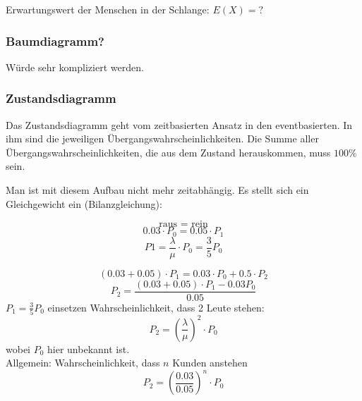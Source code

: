 \documentclass[11pt, a4paper]{article}
\begin{document}
Erwartungswert der Menschen in der Schlange: $E(X) = ?$

\subsubsection{Baumdiagramm?}

\begin{figure}[H]
\centering
{}
\end{figure}

Würde sehr kompliziert werden.

\subsubsection{Zustandsdiagramm}
Das Zustandsdiagramm geht vom zeitbasierten Ansatz in den eventbasierten. In ihm sind die jeweiligen Übergangswahrscheinlichkeiten. Die Summe aller Übergangswahrscheinlichkeiten, die aus dem Zustand herauskommen, muss $100 \%$ sein.


\begin{figure}[H]
\centering
{}
\end{figure}

Man ist mit diesem Aufbau nicht mehr zeitabhängig. Es stellt sich ein Gleichgewicht ein (Bilanzgleichung):

\begin{figure}[H]
\centering
{}
\end{figure}

\[\text{raus = rein}\]
\[0.03 \cdot P_{0} = 0.05 \cdot P_{1}\]
\[P1 = \frac{\lambda}{\mu} \cdot P_{0} = \frac{3}{5} P_{0}\]

\begin{figure}[H]
\centering
{}
\end{figure}

\[(0.03 + 0.05) \cdot P_{1} = 0.03 \cdot P_{0} + 0.5 \cdot P_{2}\]
\[P_{2} = \frac{(0.03 + 0.05) \cdot P_{1} - 0.03 P_{0}}{0.05}\]
$P_{1} = \frac{3}{5}P_{0}$ einsetzen
Wahrscheinlichkeit, dass 2 Leute stehen:
\[P_{2} = \left(\frac{\lambda}{\mu}\right)^{2}\cdot P_{0}\]
wobei $P_{0}$ hier unbekannt ist.\\
Allgemein: Wahrscheinlichkeit, dass $n$ Kunden anstehen
\[P_{2} = \left(\frac{0.03}{0.05}\right)^{n}\cdot P_{0}\]
\end{document}
